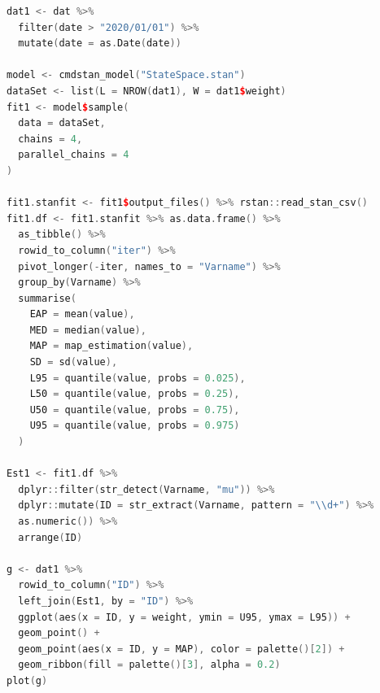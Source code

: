 \begin{lstlisting}[language=c++,label={code:29_01},caption={状態空間モデルのコード}]
dat1 <- dat %>%
  filter(date > "2020/01/01") %>%
  mutate(date = as.Date(date))

model <- cmdstan_model("StateSpace.stan")
dataSet <- list(L = NROW(dat1), W = dat1$weight)
fit1 <- model$sample(
  data = dataSet,
  chains = 4,
  parallel_chains = 4
)

fit1.stanfit <- fit1$output_files() %>% rstan::read_stan_csv()
fit1.df <- fit1.stanfit %>% as.data.frame() %>%
  as_tibble() %>%
  rowid_to_column("iter") %>%
  pivot_longer(-iter, names_to = "Varname") %>%
  group_by(Varname) %>%
  summarise(
    EAP = mean(value),
    MED = median(value),
    MAP = map_estimation(value),
    SD = sd(value),
    L95 = quantile(value, probs = 0.025),
    L50 = quantile(value, probs = 0.25),
    U50 = quantile(value, probs = 0.75),
    U95 = quantile(value, probs = 0.975)
  )

Est1 <- fit1.df %>%
  dplyr::filter(str_detect(Varname, "mu")) %>%
  dplyr::mutate(ID = str_extract(Varname, pattern = "\\d+") %>% 
  as.numeric()) %>%
  arrange(ID)

g <- dat1 %>%
  rowid_to_column("ID") %>%
  left_join(Est1, by = "ID") %>%
  ggplot(aes(x = ID, y = weight, ymin = U95, ymax = L95)) +
  geom_point() +
  geom_point(aes(x = ID, y = MAP), color = palette()[2]) +
  geom_ribbon(fill = palette()[3], alpha = 0.2)
plot(g)
\end{lstlisting}
